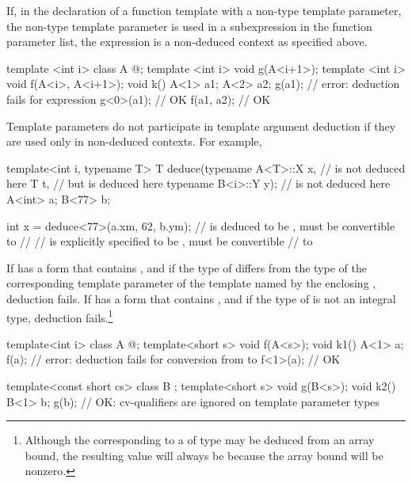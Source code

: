 \pnum
\begin{note}
If, in the declaration of a function template with a non-type
template parameter, the non-type template parameter
is used in a subexpression in the function parameter list,
the expression is a non-deduced context as specified above.
\begin{example}
\begin{codeblock}
template <int i> class A { @\commentellip@ };
template <int i> void g(A<i+1>);
template <int i> void f(A<i>, A<i+1>);
void k() {
  A<1> a1;
  A<2> a2;
  g(a1);            // error: deduction fails for expression 
  g<0>(a1);         // OK
  f(a1, a2);        // OK
}
\end{codeblock}
\end{example}
\end{note}

\pnum
\begin{note}
Template parameters do not participate in template argument deduction if
they are used only in non-deduced contexts.
For example,

\begin{codeblock}
template<int i, typename T>
T deduce(typename A<T>::X x,    //  is not deduced here
  T t,                          // but  is deduced here
  typename B<i>::Y y);          //  is not deduced here
A<int> a;
B<77>  b;

int    x = deduce<77>(a.xm, 62, b.ym);
//  is deduced to be ,  must be convertible to
// 
//  is explicitly specified to be ,  must be convertible
// to 
\end{codeblock}
\end{note}

\pnum
If  has a form that contains , and
if the type of  differs from the type
of the corresponding template parameter
of the template named by the enclosing ,
deduction fails.
If  has a form that contains \tcode{[i]}, and if the type of
 is not an integral type, deduction fails.\footnote{Although the
corresponding to a
of type
may be deduced from an array bound, the resulting value will always be
because the array bound will be nonzero.}
\begin{example}

\begin{codeblock}
template<int i> class A { @\commentellip@ };
template<short s> void f(A<s>);
void k1() {
  A<1> a;
  f(a);             // error: deduction fails for conversion from  to 
  f<1>(a);          // OK
}

template<const short cs> class B { };
template<short s> void g(B<s>);
void k2() {
  B<1> b;
  g(b);             // OK: cv-qualifiers are ignored on template parameter types
}
\end{codeblock}
\end{example}

